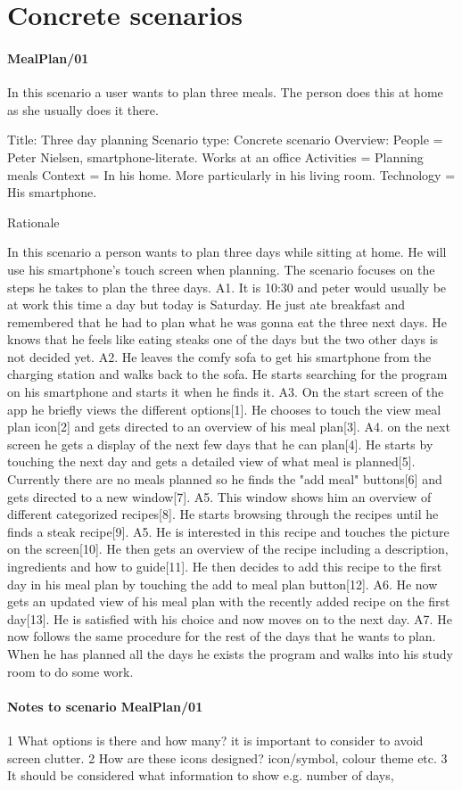 \section{Concrete scenarios}

\paragraph{MealPlan/01}
In this scenario a user wants to plan three meals. The person does this at home as she usually does it there.

Title: Three day planning
Scenario type: Concrete scenario
Overview: 
	People = Peter Nielsen, smartphone-literate. Works at an office
	Activities = Planning meals
	Context = In his home. More particularly in his living room.
	Technology = His smartphone.
	
Rationale

In this scenario a person wants to plan three days while sitting at home. He will use his smartphone's touch screen when planning. The scenario focuses on the steps he takes to plan the three days.
	A1. It is 10:30 and peter would usually be at work this time a day but today is Saturday. He just ate breakfast and remembered that he had to plan what he was gonna eat the three next days. He knows that he feels like eating steaks one of the days but the two other days is not decided yet.
	A2. He leaves the comfy sofa to get his smartphone from the charging station and walks back to the sofa. He starts searching for the program on his smartphone and starts it when he finds it.
	A3. On the start screen of the app he briefly views the different options[1]. He chooses to touch the view meal plan icon[2] and gets directed to an overview of his meal plan[3]. 
	A4. on the next screen he gets a display of the next few days that he can plan[4]. He starts by touching the next day and gets a detailed view of what meal is planned[5]. Currently there are no meals planned so he finds the "add meal" buttons[6] and gets directed to a new window[7]. 
	A5. This window shows him an overview of different categorized recipes[8]. He starts browsing through the recipes until he finds a steak recipe[9]. 
	A5. He is interested in this recipe and touches the picture on the screen[10]. He then gets an overview of the recipe including a description, ingredients and how to guide[11]. He then decides to add this recipe to the first day in his meal plan by touching the add to meal plan button[12].
	A6. He now gets an updated view of his meal plan with the recently added recipe on the first day[13]. He is satisfied with his choice and now moves on to the next day. 
	A7. He now follows the same procedure for the rest of the days that he wants to plan. When he has planned all the days he exists the program and walks into his study room to do some work.
	
\paragraph{Notes to scenario MealPlan/01}
1 What options is there and how many? it is important to consider to avoid screen clutter.
2 How are these icons designed? icon/symbol, colour theme etc.
3 It should be considered what information to show e.g. number of days, 
	  